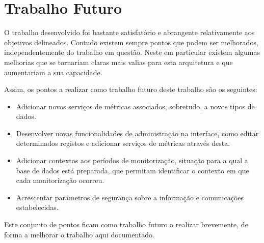 \section{Trabalho Futuro}

O trabalho desenvolvido foi bastante satisfatório e abrangente relativamente aos objetivos delineados. Contudo existem sempre pontos que podem ser melhorados, independentemente do trabalho em questão. Neste em particular existem algumas melhorias que se tornariam claras mais valias para esta arquitetura e que aumentariam a sua capacidade.

Assim, os pontos a realizar como trabalho futuro deste trabalho são os seguintes:

\begin{itemize}
	\item Adicionar novos serviços de métricas associados, sobretudo, a novos tipos de dados.
	\item Desenvolver novas funcionalidades de administração na interface, como editar determinados registos e adicionar serviços de métricas através desta.
	\item Adicionar contextos aos períodos de monitorização, situação para a qual a base de dados está preparada, que permitam identificar o contexto em que cada monitorização ocorreu.
	\item Acrescentar parâmetros de segurança sobre a informação e comunicações estabelecidas.
\end{itemize}

Este conjunto de pontos ficam como trabalho futuro a realizar brevemente, de forma a melhorar o trabalho aqui documentado.